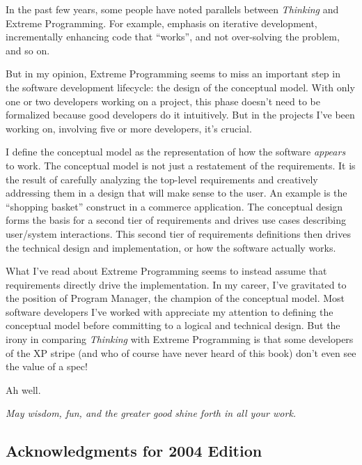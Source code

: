 In the past few years, some people have noted parallels between
\emph{Thinking \Forth{}} and Extreme Programming. For example, emphasis on
iterative development, incrementally enhancing code that ``works'', and
not over-solving the problem, and so on.

But in my opinion, Extreme Programming seems to miss an important step
in the software development lifecycle: the design of the conceptual
model. With only one or two developers working on a project, this
phase doesn't need to be formalized because good developers do it
intuitively. But in the projects I've been working on, involving five
or more developers, it's crucial.

I define the conceptual model as the representation of how the
software \emph{appears} to work. The conceptual model is not just a
restatement of the requirements. It is the result of carefully
analyzing the top-level requirements and creatively addressing them in
a design that will make sense to the user. An example is the ``shopping
basket'' construct in a commerce application. The conceptual design
forms the basis for a second tier of requirements and drives use cases
describing user/system interactions. This second tier of requirements
definitions then drives the technical design and implementation, or how
the software actually works.

What I've read about Extreme Programming seems to instead assume that
requirements directly drive the implementation. In my career, I've
gravitated to the position of Program Manager, the champion of the
conceptual model. Most software developers I've worked with appreciate
my attention to defining the conceptual model before committing to a
logical and technical design. But the irony in comparing \emph{Thinking
\Forth{}} with Extreme Programming is that some developers of the XP
stripe (and who of course have never heard of this book) don't even
see the value of a spec!

Ah well.

\begin{flushright}
\emph{May wisdom, fun, and the greater good shine forth in all your work.}

\vspace{5em}
\vspace{2.5em}
\end{flushright}

\subsection{Acknowledgments for 2004 Edition}


